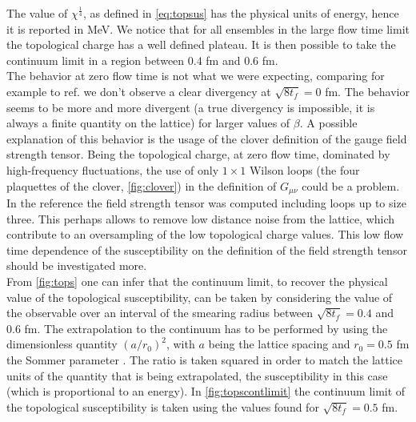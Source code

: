 The value of $\chi^{\frac{1}{4}}$, as defined in \cref{eq:topsus} has the physical units of energy, hence it is reported in MeV. We notice that for all ensembles in the large flow time limit the topological charge has a well defined plateau. It is then possible to take the continuum limit in a region between $0.4$ fm and $0.6$ fm. \\
The behavior at zero flow time is not what we were expecting, comparing for example to ref. \cite{shindler_nucleon_2015} we don't observe a clear divergency at $\sqrt{8t_f} = 0$ fm. The behavior seems to be more and more divergent (a true divergency is impossible, it is always a finite quantity on the lattice) for larger values of $\beta$. A possible explanation of this behavior is the usage of the clover definition of the gauge field strength tensor. Being the topological charge, at zero flow time, dominated by high-frequency fluctuations, the use of only $1\times1$ Wilson loops (the four plaquettes of the clover, \cref{fig:clover}) in the definition of $G_{\mu\nu}$ could be a problem. In the reference the field strength tensor was computed including loops up to size three. This perhaps allows to remove low distance noise from the lattice, which contribute to an oversampling of the low topological charge values. This low flow time dependence of the susceptibility on the definition of the field strength tensor should be investigated more. \\
From \cref{fig:tops} one can infer that the continuum limit, to recover the physical value of the topological susceptibility, can be taken by considering the value of the observable over an interval of the smearing radius between  $\sqrt{8t_f} = 0.4$ and $0.6$ fm. The extrapolation to the continuum has to be performed by using the dimensionless quantity $(a/r_0)^2$, with $a$ being the lattice spacing and $r_0 = 0.5$ fm the Sommer parameter \cite{guagnelli_precision_1998}. The ratio is taken squared in order to match the lattice units of the quantity that is being extrapolated, the susceptibility in this case (which is proportional to an energy). In \cref{fig:topscontlimit} the continuum limit of the topological susceptibility is taken using the values found for $\sqrt{8t_f}=0.5$ fm.   


